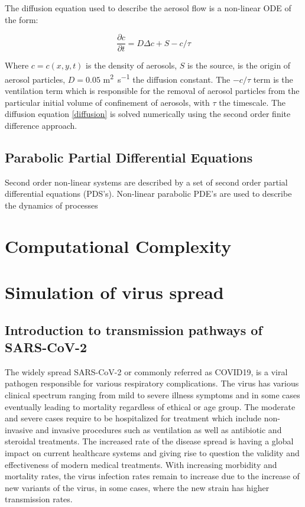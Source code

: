 \documentclass[11pt]{report}
\begin{document}
The diffusion equation used to describe the aerosol flow is a non-linear ODE of the form:

\begin{equation}
    \frac{\partial c}{\partial t} = D \Delta c + S - c/ \tau
    \label{diffusion}
\end{equation}

Where $c = c(x,y,t)$ is the density of aerosols, $S$ is the source, is the origin of aerosol particles, $D=0.05$ \si{\meter^2\second^{-1}} the diffusion constant. The $-c/\tau$ term is the ventilation term which is responsible for the removal of aerosol particles from the particular initial volume of confinement of aerosols, with $\tau$ the timescale. The diffusion equation \ref{diffusion} is solved numerically using the second order finite difference approach.

\subsection{Parabolic Partial Differential Equations}

Second order non-linear systems are described by a set of second order partial differential equations (PDS's). Non-linear parabolic PDE's are used to describe the dynamics of processes  


\section{Computational Complexity}


\section{Simulation of virus spread}

\subsection{Introduction to transmission pathways of SARS-CoV-2}

The widely spread SARS-CoV-2 or commonly referred as COVID19, is a viral pathogen responsible for various respiratory complications. The virus has various clinical spectrum ranging from mild to severe illness symptoms and in some cases eventually leading to mortality regardless of ethical or age group. The moderate and severe cases require to be hospitalized for treatment which include non-invasive and invasive procedures such as ventilation as well as antibiotic and steroidal treatments. The increased rate of the disease spread is having a global impact on current healthcare systems and giving rise to question the validity and effectiveness of modern medical treatments. With increasing morbidity and mortality rates, the virus infection rates remain to increase due to the increase of new variants of the virus, in some cases, where the new strain has higher transmission rates. 
\end{document}
